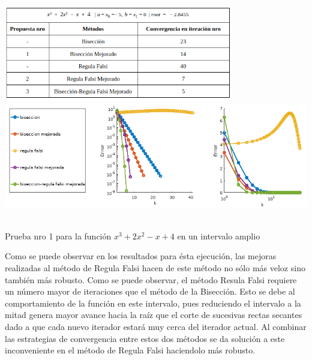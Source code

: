 \documentclass[11pt]{article}
\begin{document}
\begin{center}
    \includegraphics[keepaspectratio, width=10cm]{C2.png}
    \vspace{0.5cm}
    \includegraphics[keepaspectratio, width=14cm]{G2.png}
     \caption \tiny{\\ Prueba nro 1 para la función $x^3 + 2x^2 - x + 4$ en un intervalo amplio}
\end{center} 
Como se puede observar en los resultados para ésta ejecución, las mejoras realizadas al método de Regula Falsi hacen de este método no sólo más veloz sino también más robusto. Como se puede observar, el método Resula Falsi requiere un número mayor de iteraciones que el método de la Bisección. Esto se debe al comportamiento de la función en este intervalo, pues reduciendo el intervalo a la mitad genera mayor avance hacia la raíz que el corte de sucesivas rectas secantes dado a que cada nuevo iterador estará muy cerca del iterador actual. Al combinar las estrategias de convergencia entre estos dos métodos se da solución a este inconveniente en el método de Regula Falsi haciendolo más robusto.
\vspace{0.75cm}
\end{document}
